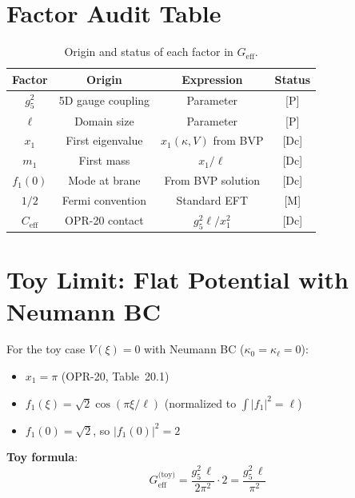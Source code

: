 \section{Factor Audit Table}
\label{sec:ch19_factor_audit}

\begin{table}[h]
\centering
\begin{tabular}{|c|c|c|c|}
\hline
\textbf{Factor} & \textbf{Origin} & \textbf{Expression} & \textbf{Status} \\
\hline
$g_5^2$ & 5D gauge coupling & Parameter & [P] \\
$\ell$ & Domain size & Parameter & [P] \\
$x_1$ & First eigenvalue & $x_1(\kappa, V)$ from BVP & [Dc] \\
$m_1$ & First mass & $x_1 / \ell$ & [Dc] \\
$f_1(0)$ & Mode at brane & From BVP solution & [Dc] \\
$1/2$ & Fermi convention & Standard EFT & [M] \\
$C_{\text{eff}}$ & OPR-20 contact & $g_5^2 \ell / x_1^2$ & [Dc] \\
\hline
\end{tabular}
\caption{Origin and status of each factor in $G_{\text{eff}}$.}
\label{tab:ch19_factor_audit}
\end{table}


\section{Toy Limit: Flat Potential with Neumann BC}
\label{sec:ch19_toy}

For the toy case $V(\xi) = 0$ with Neumann BC ($\kappa_0 = \kappa_\ell = 0$):
\begin{itemize}
    \item $x_1 = \pi$ (OPR-20, Table~20.1)
    \item $f_1(\xi) = \sqrt{2} \cos(\pi \xi / \ell)$ (normalized to $\int |f_1|^2 = \ell$)
    \item $f_1(0) = \sqrt{2}$, so $|f_1(0)|^2 = 2$
\end{itemize}

\textbf{Toy formula}:
\begin{equation}
    G_{\text{eff}}^{\text{(toy)}} = \frac{g_5^2 \, \ell}{2 \pi^2} \cdot 2
    = \frac{g_5^2 \, \ell}{\pi^2}
    \label{eq:ch19_geff_toy}
\end{equation}

